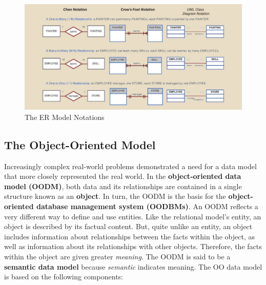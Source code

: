 \documentclass[a4paper, 12pt, titlepage]{report}
\begin{document}
\begin{figure}[H]
\centering
\includegraphics[scale=0.3]{ERNot}
\caption{The ER Model Notations}
\end{figure}
 
\subsection{The Object-Oriented Model}
Increasingly complex real-world problems demonstrated a need for a data model that more closely represented the real world. In the \textbf{object-oriented data model (OODM)}, both data and its relationships are contained in a single structure known as an \textbf{object}. In turn, the OODM is the basis for the \textbf{object-oriented database management system (OODBMs)}. An OODM reflects a very different way to define and use entities. Like the relational model’s entity, an object is described by its factual content. But, quite unlike an entity, an object includes information about relationships between the facts within the object, as well as information about its relationships with other objects. Therefore, the facts within the object are given greater \emph{meaning}. The OODM is said to be a \textbf{semantic data model} because \emph{semantic} indicates meaning.
The OO data model is based on the following components:
\end{document}
